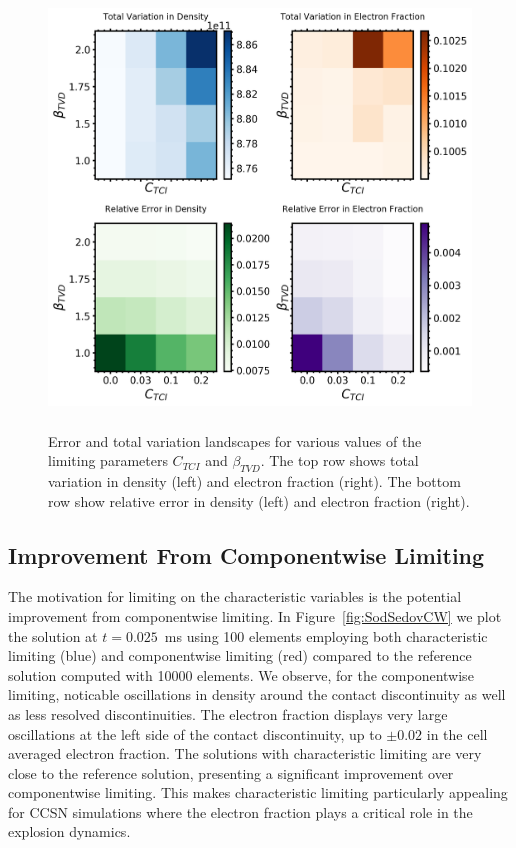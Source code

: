 \documentclass[onecolumn]{aastex62}
\begin{document}
\begin{figure}[b]
  \centering
  \includegraphics[width=32pc, height=27.5pc]{./figures/error_tv_landscape.png}
  \caption{\label{fig:landscape} Error and total variation landscapes for various
  values of the limiting parameters $C_{TCI}$ and $\beta_{TVD}$. The top row shows
  total variation in density (left) and electron fraction (right). The bottom
  row show relative error in density (left) and electron fraction (right).}
\end{figure}

\subsection{Improvement From Componentwise Limiting}
\label{sec:optimal}
The motivation for limiting on the characteristic variables is the potential
improvement from componentwise limiting. In Figure~\ref{fig:SodSedovCW} we plot the
solution at $t = 0.025$~ms using 100 elements employing both characteristic
limiting (blue) and componentwise limiting (red) compared to the reference
solution computed with 10000 elements. We observe, for the componentwise limiting,
noticable oscillations in density around the contact discontinuity as well
as less resolved discontinuities. The electron fraction displays very
large oscillations at the left side of the contact discontinuity, up to
$\pm 0.02$ in the cell averaged electron fraction. The solutions with
characteristic limiting are very close to the reference solution, presenting
a significant improvement over componentwise limiting.
This makes characteristic
limiting particularly appealing for CCSN simulations where the electron fraction
plays a critical role in the explosion dynamics.
\end{document}
